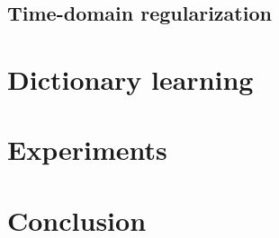 \documentclass{article} %
\begin{document}
\subsection{Time-domain regularization}


\section{Dictionary learning}

\section{Experiments}
\section{Conclusion}



\end{document}
